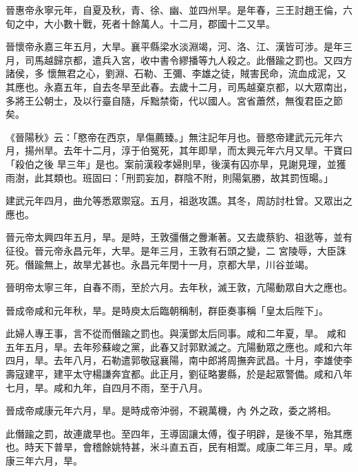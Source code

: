 \begin{pinyinscope}
 晉惠帝永寧元年，自夏及秋，青、徐、幽、並四州旱。是年春，三王討趙王倫，六旬之中，大小數十戰，死者十餘萬人。十二月，郡國十二又旱。



 晉懷帝永嘉三年五月，大旱。襄平縣梁水淡淵竭，河、洛、江、漢皆可涉。是年三月，司馬越歸京都，遣兵入宮，收中書令繆播等九人殺之。此僭踰之罰也。又四方諸侯，多
 懷無君之心，劉淵、石勒、王彌、李雄之徒，賊害民命，流血成泥，又其應也。永嘉五年，自去冬旱至此春。去歲十二月，司馬越棄京都，以大眾南出，多將王公朝士，及以行臺自隨，斥黜禁衛，代以國人。宮省蕭然，無復君臣之節矣。



 《晉陽秋》云：「愍帝在西京，旱傷薦臻。」無注記年月也。晉愍帝建武元元年六月，揚州旱。去年十二月，淳于伯冤死，其年即旱，而太興元年六月又旱。干寶曰「殺伯之後
 旱三年」是也。案前漢殺孝婦則旱，後漢有囚亦旱，見謝見理，並獲雨澍，此其類也。班固曰：「刑罰妄加，群陰不附，則陽氣勝，故其罰恆暘。」



 建武元年四月，曲允等悉眾禦寇。五月，祖逖攻譙。其冬，周訪討杜曾。又眾出之應也。



 晉元帝太興四年五月，旱。是時，王敦彊僭之釁漸著。又去歲蔡豹、祖逖等，並有征役。晉元帝永昌元年，大旱。是年三月，王敦有石頭之變，二
 宮陵辱，大臣誅死。僭踰無上，故旱尤甚也。永昌元年閏十一月，京都大旱，川谷並竭。



 晉明帝太寧三年，自春不雨，至於六月。去年秋，滅王敦，亢陽動眾自大之應也。



 晉成帝咸和元年秋，旱。是時庾太后臨朝稱制，群臣奏事稱「皇太后陛下」。



 此婦人專王事，言不從而僭踰之罰也。與漢鄧太后同事。咸和二年夏，旱。
 咸和五年五月，旱。去年殄蘇峻之黨，此春又討郭默滅之。亢陽動眾之應也。咸和六年四月，旱。去年八月，石勒遣郭敬寇襄陽，南中郎將周撫奔武昌。十月，李雄使李壽寇建平，建平太守楊謙奔宜都。此正月，劉征略婁縣，於是起眾警備。咸和八年七月，旱。咸和九年，自四月不雨，至于八月。



 晉成帝咸康元年六月，旱。是時成帝沖弱，不親萬機，內
 外之政，委之將相。



 此僭踰之罰，故連歲旱也。至四年，王導固讓太傅，復子明辟，是後不旱，殆其應也。時天下普旱，會稽餘姚特甚，米斗直五百，民有相鬻。咸康二年三月，旱。咸康三年六月，旱。




\end{pinyinscope}

